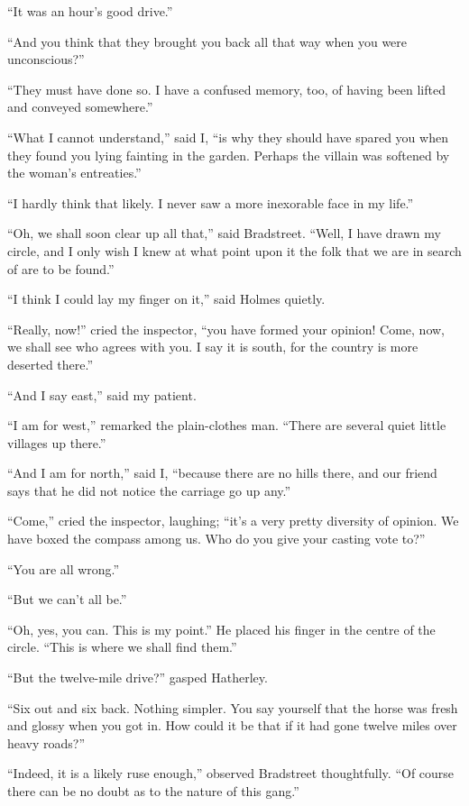 \documentclass{article}
\begin{document}
``It was an hour's good drive.''

``And you think that they brought you back all that way when you were
unconscious?''

``They must have done so. I have a confused memory, too, of having been
lifted and conveyed somewhere.''

``What I cannot understand,'' said I, ``is why they should have spared
you when they found you lying fainting in the garden. Perhaps the villain
was softened by the woman's entreaties.''

``I hardly think that likely. I never saw a more inexorable face in
my life.''

``Oh, we shall soon clear up all that,'' said Bradstreet. ``Well, I have
drawn my circle, and I only wish I knew at what point upon it the folk
that we are in search of are to be found.''

``I think I could lay my finger on it,'' said Holmes quietly.

``Really, now!'' cried the inspector, ``you have formed your
opinion! Come, now, we shall see who agrees with you. I say it is south,
for the country is more deserted there.''

``And I say east,'' said my patient.

``I am for west,'' remarked the plain-clothes man. ``There are several
quiet little villages up there.''

``And I am for north,'' said I, ``because there are no hills there,
and our friend says that he did not notice the carriage go up any.''

``Come,'' cried the inspector, laughing; ``it's a very pretty diversity
of opinion. We have boxed the compass among us. Who do you give your
casting vote to?''

``You are all wrong.''

``But we can't all be.''

``Oh, yes, you can. This is my point.'' He placed his finger in the
centre of the circle. ``This is where we shall find them.''

``But the twelve-mile drive?'' gasped Hatherley.

``Six out and six back. Nothing simpler. You say yourself that the horse
was fresh and glossy when you got in. How could it be that if it had
gone twelve miles over heavy roads?''

``Indeed, it is a likely ruse enough,'' observed Bradstreet
thoughtfully. ``Of course there can be no doubt as to the nature of
this gang.''
\end{document}
